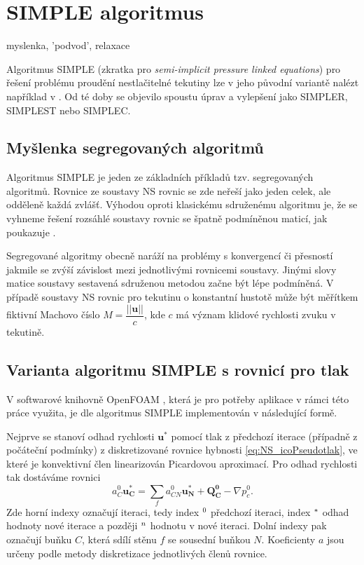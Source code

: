 \section{SIMPLE algoritmus}


myslenka, 'podvod', relaxace

Algoritmus SIMPLE (zkratka pro \textit{semi-implicit pressure linked equations}) pro řešení problému proudění nestlačitelné tekutiny lze v jeho původní variantě nalézt například v \cite{patankar1983calculation}. Od té doby se objevilo spoustu úprav a vylepšení jako SIMPLER, SIMPLEST nebo SIMPLEC. 

\subsection{Myšlenka segregovaných algoritmů}
Algoritmus SIMPLE je jeden ze základních příkladů tzv. segregovaných algoritmů. Rovnice ze soustavy NS rovnic se zde neřeší jako jeden celek, ale odděleně každá zvlášť. Výhodou oproti klasickému sdruženému algoritmu je, že se vyhneme řešení rozsáhlé soustavy rovnic se špatně podmíněnou maticí, jak poukazuje \cite{furst2020mko2}. 

Segregované algoritmy obecně naráží na problémy s konvergencí či přesností jakmile se zvýší závislost mezi jednotlivými rovnicemi soustavy. Jinými slovy matice soustavy sestavená sdruženou metodou začne být lépe podmíněná. V případě soustavy NS rovnic pro tekutinu o konstantní hustotě může být měřítkem fiktivní Machovo číslo $ M = \dfrac{||\mathbf{u}||}{c} $, kde $ c $ má význam klidové rychlosti zvuku v tekutině.

\subsection{Varianta algoritmu SIMPLE s rovnicí pro tlak}
V softwarové knihovně OpenFOAM \cite{weller1998tensorial}, která je pro potřeby aplikace v rámci této práce využita, je dle \cite{furst2020mko2} algoritmus SIMPLE implementován v následující formě. 

Nejprve se stanoví odhad rychlosti $ \mathbf{u}^* $ pomocí tlak z předchozí iterace (případně z počáteční podmínky) z diskretizované rovnice hybnosti \ref{eq:NS_icoPseudotlak}, ve které je konvektivní člen linearizován Picardovou aproximací. Pro odhad rychlosti tak dostáváme rovnici
\begin{equation}
a_C^0\mathbf{u_C^*}=\sum_f a_{CN}^0 \mathbf{u_N^*}+\mathbf{Q_C^0}-\nabla p_c^0.
\end{equation}
Zde horní indexy označují iteraci, tedy index $ \null^0 $ předchozí iteraci, index $ \null^* $ odhad hodnoty nové iterace a později $ \null^n $ hodnotu v nové iteraci. Dolní indexy pak označují buňku $ C $, která sdílí stěnu $ f $ se sousední buňkou $ N $. Koeficienty $ a $ jsou určeny podle metody diskretizace jednotlivých členů rovnice.

